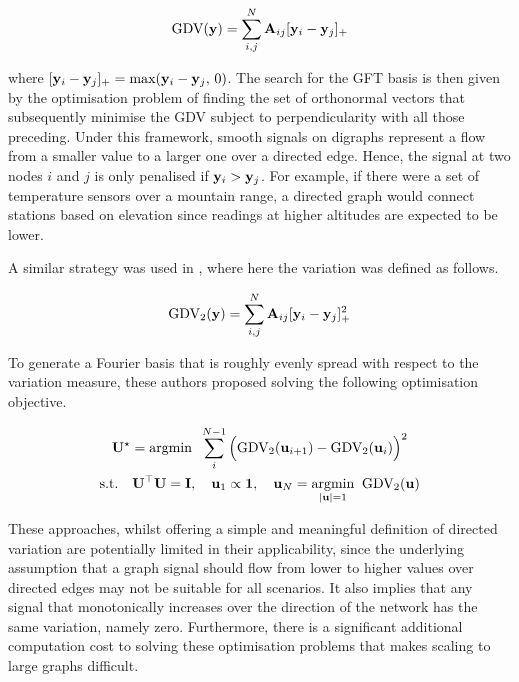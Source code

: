 \begin{equation}
    \text{GDV}(\mathbf{y}) = \sum_{i,j}^N \mathbf{A}_{ij} [\mathbf{y}_i - \mathbf{y}_j]_{+}
\end{equation}

where $[\mathbf{y}_i - \mathbf{y}_j]_{+} = \text{max}(\mathbf{y}_i - \mathbf{y}_j, \, 0)$. The search for the GFT basis is then given by the optimisation problem of finding the set of orthonormal vectors that subsequently minimise the GDV subject to perpendicularity with all those preceding. Under this framework, smooth signals on digraphs represent a flow from a smaller value to a larger one over a directed edge. Hence, the signal at two nodes $i$ and $j$ is only penalised if $\mathbf{y}_i > \mathbf{y}_j$. For example, if there were a set of temperature sensors over a mountain range, a directed graph would connect stations based on elevation since readings at higher altitudes are expected to be lower. 

A similar strategy was used in \cite{Shafipour2019}, where here the variation was defined as follows.  

\begin{equation}
    \text{GDV}_2(\mathbf{y}) = \sum_{i,j}^N \mathbf{A}_{ij} [\mathbf{y}_i - \mathbf{y}_j]_{+}^2
\end{equation}

To generate a Fourier basis that is roughly evenly spread with respect to the variation measure, these authors proposed solving the following optimisation objective. 

\begin{equation}
    \begin{gathered}
    \mathbf{U}^{\star} = \text{argmin} \;\; \sum_{i}^{N-1} \Big(\text{GDV}_2(\mathbf{u}_{i+1}) - \text{GDV}_2(\mathbf{u}_i)\Big)^2 \\
    \text{s.t.} \quad \mathbf{U}^\top\mathbf{U} = \mathbf{I}, \quad \mathbf{u}_1 \propto \mathbf{1}, \quad \mathbf{u}_N = \underset{|\mathbf{u}| = 1}{\text{argmin} } \;\; \text{GDV}_2(\mathbf{u})
    \end{gathered}
\end{equation}

These approaches, whilst offering a simple and meaningful definition of directed variation are potentially limited in their applicability, since the underlying assumption that a graph signal should flow from lower to higher values over directed edges may not be suitable for all scenarios. It also implies that any signal that monotonically increases over the direction of the network has the same variation, namely zero. Furthermore, there is a significant additional computation cost to solving these optimisation problems that makes scaling to large graphs difficult. 


